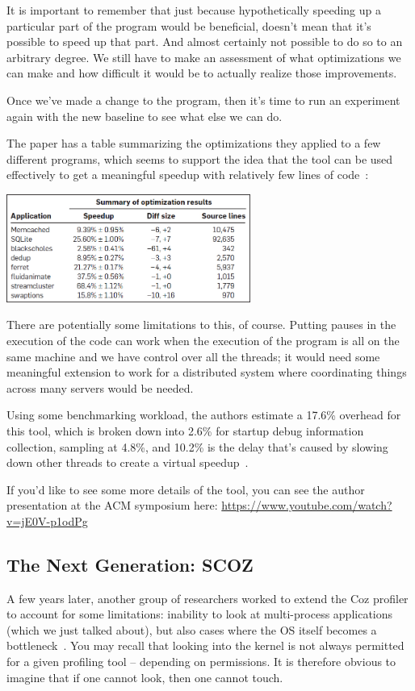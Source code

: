 It is important to remember that just because hypothetically speeding up a particular part of the program would be beneficial, doesn't mean that it's possible to speed up that part. And almost certainly not possible to do so to an arbitrary degree. We still have to make an assessment of what optimizations we can make and how difficult it would be to actually realize those improvements.

Once we've made a change to the program, then it's time to run an experiment again with the new baseline to see what else we can do.

The paper has a table summarizing the optimizations they applied to a few different programs, which seems to support the idea that the tool can be used effectively to get a meaningful speedup with relatively few lines of code~\cite{coz}:
\begin{center}
	\includegraphics[width=0.6\textwidth]{images/coz-speedup.jpg}
\end{center}

There are potentially some limitations to this, of course. Putting pauses in the execution of the code can work when the execution of the program is all on the same machine and we have control over all the threads; it would need some meaningful extension to work for a distributed system where coordinating things across many servers would be needed.

Using some benchmarking workload, the authors estimate a 17.6\% overhead for this tool, which is broken down into 2.6\% for startup debug information collection, sampling at 4.8\%, and 10.2\% is the delay that's caused by slowing down other threads to create a virtual speedup~\cite{coz}.

If you'd like to see some more details of the tool, you can see the author presentation at the ACM symposium here: \url{https://www.youtube.com/watch?v=jE0V-p1odPg}

\subsection*{The Next Generation: SCOZ}
A few years later, another group of researchers worked to extend the Coz profiler to account for some limitations: inability to look at multi-process applications (which we just talked about), but also cases where the OS itself becomes a bottleneck~\cite{scoz}. You may recall that looking into the kernel is not always permitted for a given profiling tool -- depending on permissions.  It is therefore obvious to imagine that if one cannot look, then one cannot touch. 

